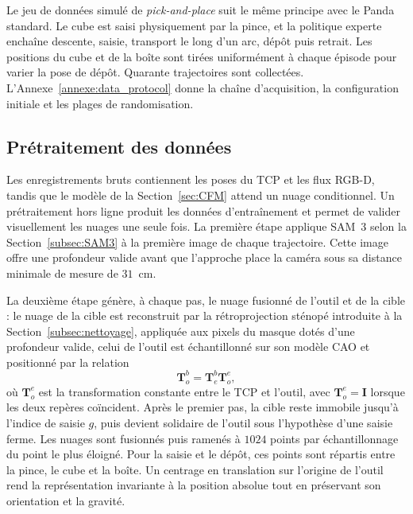 Le jeu de données simulé de \textit{pick-and-place} suit le même principe avec le Panda standard. Le cube est saisi physiquement par la pince, et la politique experte enchaîne descente, saisie, transport le long d'un arc, dépôt puis retrait. Les positions du cube et de la boîte sont tirées uniformément à chaque épisode pour varier la pose de dépôt. Quarante trajectoires sont collectées. L'Annexe~\ref{annexe:data_protocol} donne la chaîne d'acquisition, la configuration initiale et les plages de randomisation.

\subsection{Prétraitement des données}\label{subsec:pretraitement}

Les enregistrements bruts contiennent les poses du \ac{TCP} et les flux \ac{RGB-D}, tandis que le modèle de la Section~\ref{sec:CFM} attend un nuage conditionnel. Un prétraitement hors ligne produit les données d'entraînement et permet de valider visuellement les nuages une seule fois. La première étape applique \ac{SAM}~3 selon la Section~\ref{subsec:SAM3} à la première image de chaque trajectoire. Cette image offre une profondeur valide avant que l'approche place la caméra sous sa distance minimale de mesure de $31$~cm.

La deuxième étape génère, à chaque pas, le nuage fusionné de l'outil et de la cible : le nuage de la cible est reconstruit par la rétroprojection sténopé introduite à la Section~\ref{subsec:nettoyage}, appliquée aux pixels du masque dotés d'une profondeur valide, celui de l'outil est échantillonné sur son modèle \ac{CAO} et positionné par la relation
\begin{equation}\label{eq:pose_fork}
  \mathbf{T}_{o}^{b} = \mathbf{T}_{e}^{b} \mathbf{T}_{o}^{e},
\end{equation}
où $\mathbf{T}_{o}^{e}$ est la transformation constante entre le \ac{TCP} et l'outil, avec $\mathbf{T}_{o}^{e} = \mathbf{I}$ lorsque les deux repères coïncident. Après le premier pas, la cible reste immobile jusqu'à l'indice de saisie $g$, puis devient solidaire de l'outil sous l'hypothèse d'une saisie ferme. Les nuages sont fusionnés puis ramenés à $1024$ points par échantillonnage du point le plus éloigné. Pour la saisie et le dépôt, ces points sont répartis entre la pince, le cube et la boîte. Un centrage en translation sur l'origine de l'outil rend la représentation invariante à la position absolue tout en préservant son orientation et la gravité.

